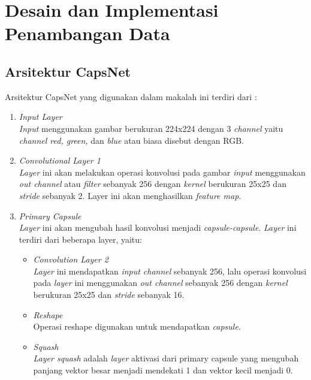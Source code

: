 \documentclass{article}
\begin{document}
	\section{Desain dan Implementasi Penambangan Data}
		\subsection{Arsitektur CapsNet}
		Arsitektur CapsNet yang digunakan dalam makalah ini terdiri dari :
		\begin{enumerate}
			\item \textit{Input Layer}\\
			\textit{Input} menggunakan gambar berukuran 224x224 dengan 3 \textit{channel} yaitu \textit{channel red, green,} dan \textit{blue} atau biasa disebut dengan RGB.
			
			\item \textit{Convolutional Layer 1}\\
			\textit{Layer} ini akan melakukan operasi konvolusi pada gambar \textit{input} menggunakan \textit{out channel} atau \textit{filter} sebanyak 256 dengan \textit{kernel} berukuran 25x25 dan \textit{stride} sebanyak 2. Layer ini akan menghasilkan \textit{feature map}.
			
			\item \textit{Primary Capsule}\\
			\textit{Layer} ini akan mengubah hasil konvolusi menjadi \textit{capsule-capsule}. \textit{Layer} ini terdiri dari beberapa layer, yaitu:
			\begin{itemize}
				\item \textit{Convolution Layer 2}\\ 
				\textit{Layer} ini mendapatkan \textit{input channel} sebanyak 256, lalu operasi konvolusi pada \textit{layer} ini menggunakan \textit{out channel} sebanyak 256 dengan \textit{kernel} berukuran 25x25  dan \textit{stride} sebanyak 16.
				
				\item \textit{Reshape}\\
				Operasi reshape digunakan untuk mendapatkan \textit{capsule}.
				
				\item \textit{Squash}\\
				\textit{Layer squash} adalah \textit{layer} aktivasi dari primary capsule yang mengubah panjang vektor besar menjadi mendekati 1 dan vektor kecil menjadi 0.
			\end{itemize}
			

\end{enumerate}
\end{document}
